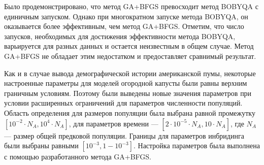 \begin{table}[ht]
    \centering
    \caption{Результаты 100 повторов различных методов для поиска параметров модели 2 с инбридингом демографической истории одной популяции огородной капусты}
    \label{tab:part2:experiments:cabbage:cabbage_F_res}
\end{table}

Было продемонстрировано, что метод GA+BFGS превосходит метод BOBYQA с единичным запуском.
Однако при многократном запуске метода BOBYQA, он оказывается более эффективным, чем метод GA+BFGS.
Отметим, что число запусков, необходимых для достижения эффективности метода BOBYQA, варьируется для разных данных и остается неизвестным в общем случае.
Метод GA+BFGS не обладает этим недостатком и предоставляет сравнимый результат.

Как и в случае вывода демографической истории американской пумы, некоторые настроенные параметры для моделей огородной капусты были равны верхним граничным условиям.
Поэтому были выведены новые значения параметров при условии расширенных ограничений для параметров численности популяций.
Область определения для размеров популяции была выбрана равной промежутку ${[10^{-2}\cdot N_A, 10^4\cdot N_A]}$, для параметров времени --- ${[2\cdot 10^{-5}\cdot N_A, 10 \cdot N_A]}$, где $N_A$ --- размер общей предковой популяции.
Границы для параметров инбридинга были выбраны равными $[10^{-3}, 1 - 10^{-3}]$.
Настройка параметров была выполнена с помощью разработанного метода GA+BFGS.

